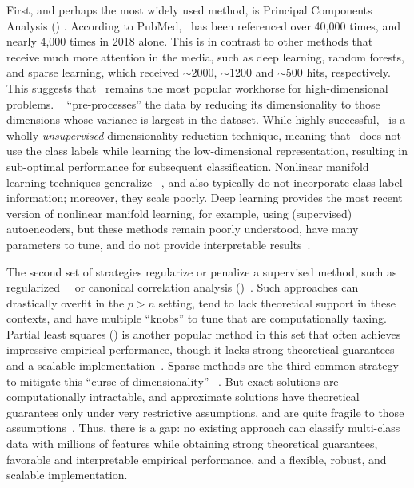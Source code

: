 \documentclass[11pt]{extarticle}
\begin{document}
First, and perhaps the most widely used method, is Principal Components Analysis (\Pca) \cite{Jolliffe1986}. According to PubMed, \Pca~has been referenced over 40,000 times, and nearly 4,000 times in 2018 alone.  This is in contrast to other methods that receive much more attention in the media, such as deep learning, random forests, and sparse learning, which received $\sim 2000$, $\sim 1200$  and $\sim 500$ hits, respectively. This suggests that \Pca~remains the most popular workhorse  for high-dimensional problems.  \Pca~ ``pre-processes'' the data by reducing its dimensionality  to those dimensions whose variance is largest in the dataset.  While highly successful, \Pca~is a wholly \emph{unsupervised} dimensionality reduction technique, meaning that \Pca~does not use the class labels while learning the low-dimensional representation, resulting in sub-optimal performance for subsequent classification.  Nonlinear manifold learning techniques generalize \Pca~\cite{Lee2007-bw}, and also typically do not incorporate class label information; moreover, they scale poorly. Deep learning provides the most recent version of nonlinear manifold learning, for example, using (supervised) autoencoders, but these methods remain poorly understood, have many parameters to tune, and do not provide interpretable results~\cite{Goodfellow2016-ac}.




The second set of strategies  regularize or penalize a supervised method, such as regularized~\Lda~\cite{Witten2009a} or canonical correlation analysis (\Cca)~\cite{Shin11}.  Such approaches can drastically overfit in the $p>n$ setting, tend to lack theoretical support in these contexts,  and have multiple ``knobs'' to tune that are computationally taxing.
Partial least squares (\Pls) is another popular method in this set that often achieves impressive empirical performance, though it lacks strong theoretical guarantees and a scalable implementation~\cite{Ter_Braak1998-cc, Brereton2014-wr}.
Sparse methods are the third common strategy to mitigate this ``curse of dimensionality''~ \cite{Tibshirani1996,Fan2012a,Hastie2015}. But exact solutions are computationally intractable, and approximate solutions have theoretical guarantees only under very restrictive assumptions, and are quite fragile to those assumptions~\cite{Su2015}.
Thus, there is a gap: no existing  approach  can classify multi-class data with millions of features while  obtaining strong theoretical guarantees,  favorable and interpretable empirical performance, and a flexible, robust, and scalable implementation.
\end{document}
